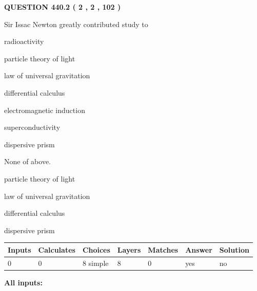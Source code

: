 \documentclass[12pt]{article}
\begin{document}
\vspace{0.2in}
  
{\textbf{\Large{QUESTION
440.2 
 ( 2 , 2 , 102 )
}}}
  
  
Sir Issac Newton greatly contributed study to
 
 
radioactivity
 
 
particle theory of light
 
 
law of universal gravitation
 
 
differential calculus
 
 
electromagnetic induction
 
 
superconductivity
 
 
dispersive prism
 
 
 None of above.
 
 
\noindent{}
 
 
particle theory of light
 
 
law of universal gravitation
 
 
differential calculus
 
 
dispersive prism
 
 
\noindent{}
 
 
   
   
   
   
\noindent\begin{tabular}{|l|l|l|l|l|l|l|}
 \hline
Inputs & Calculates & Choices & Layers & Matches & Answer & Solution \\ \hline
 0  & 
 0  & 
 8
  simple  
  & 
 8  & 
 0  & 
  yes & 
  no 
  \\ \hline
 \end{tabular}
   
   
   
   
\noindent{}
   
   
   
   
\noindent\vspace{0.1in}\hspace{-0.08in} {\textbf{\Large{All inputs: }}}
   
\end{document}
